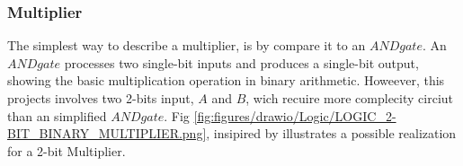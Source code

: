 \subsubsection{Multiplier}
The simplest way to describe a multiplier, is by compare it to an $AND  gate$. An $AND gate$ processes two single-bit inputs and produces a single-bit output, showing the basic multiplication operation in binary arithmetic. Howeever, this projects involves two 2-bits input, $A$ and $B$, wich recuire more complecity circiut than an simplified $AND gate$. Fig \ref{fig:figures/drawio/Logic/LOGIC_2-BIT_BINARY_MULTIPLIER.png}, insipired by \cite{nesoacademy_2016_2bit} illustrates a possible realization for a 2-bit Multiplier.


